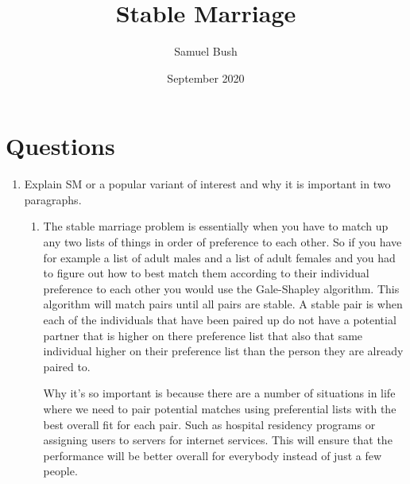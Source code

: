 \documentclass{article}
\title{Stable Marriage}
\author{Samuel Bush}
\date{September 2020}
\begin{document}
\maketitle

\section {Questions}
\begin{enumerate}
    \item {Explain SM or a popular variant of interest and why it is important in two paragraphs.}
    \begin{enumerate}
        \item The stable marriage problem is essentially when you have to match up any two lists of things in order of preference to each other. So if you have for example a list of adult males and a list of adult females and you had to figure out how to best match them according to their individual preference to each other you would use the Gale-Shapley algorithm. This algorithm will match pairs until all pairs are stable. A stable pair is when each of the individuals that have been paired up do not have a potential partner that is higher on there preference list that also that same individual higher on their preference list than the person they are already paired to. 

        Why it's so important is because there are a number of situations in life where we need to pair potential matches using preferential lists with the best overall fit for each pair. Such as hospital residency programs or assigning users to servers for internet services. This will ensure that the performance will be better overall for everybody instead of just a few people.
    \end{enumerate}


\end{enumerate}
\end{document}
